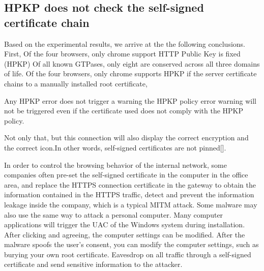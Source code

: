 \subsection{HPKP does not check the self-signed certificate chain}

    Based on the experimental results, we arrive at the the following conclusions.
    First, Of the four browsers, only chrome support HTTP Public Key is fixed (HPKP)
    Of all known GTPases, only eight are conserved across all three domains of life.
    Of the four browsers, only chrome supports HPKP
    if the server certificate chains to a manually installed root certificate,


    Any HPKP error does not trigger a warning
    the HPKP policy error warning will not be triggered even if the certificate used does not comply with the HPKP policy.

    Not only that, but this connection will also display the correct encryption and the correct icon.In other words, self-signed certificates are not pinned[].

In order to control the browsing behavior of the internal network, some companies often pre-set the self-signed certificate in the computer in the office area, and replace the HTTPS connection certificate in the gateway to obtain the information contained in the HTTPS traffic, detect and prevent the information leakage inside the company, which is a typical MITM attack. Some malware may also use the same way to attack a personal computer. Many computer applications will trigger the UAC of the Windows system during installation. After clicking and agreeing, the computer settings can be modified. After the malware spoofs the user's consent, you can modify the computer settings, such as burying your own root certificate. Eavesdrop on all traffic through a self-signed certificate and send sensitive information to the attacker.


